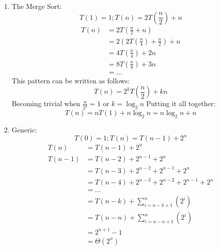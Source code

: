 \documentclass[11pt]{article}
\begin{document}
\begin{enumerate}
\begin{enumerate}
            \item The Merge Sort:
            $$T(1) = 1; T(n) = 2T(\frac{n}{2}) + n$$
            \begin{equation}
                \label{eq2}
                \begin{split}
                    T(n) & = 2T(\frac{n}{2} + n) \\
                         & = 2(2T(\frac{n}{4}) + \frac{n}{2}) + n \\
                         & = 4T(\frac{n}{4}) + 2n \\
                         & = 8T(\frac{n}{8}) + 3n \\
                         & = \ldots
                \end{split}
            \end{equation}
            This pattern can be written as follows: $$T(n) = 2^kT(\frac{n}{2}) + kn$$
            Becoming trivial when $\frac{n}{2^k} = 1$ or $k = \log_{2}n$
            Putting it all together: $$T(n) = nT(1) + n \log_{2}n = n \log_{2}n + n$$
        
            \item Generic:
            $$T(0) = 1; T(n) = T(n - 1) + 2^n$$
            \begin{equation}
                \label{eq3}
                \begin{split}
                    T(n)   & = T(n - 1) + 2^n \\
                    T(n-1) & = T(n - 2) + 2^{n-1} + 2^n \\
                           & = T(n - 3) + 2^{n-2} + 2^{n-1} + 2^n \\
                           & = T(n - 4) + 2^{n-3} + 2^{n-2} + 2^{n-1} + 2^n\\
                           & = \ldots \\
                           & = T(n - k) + \sum_{i=n-k+1}^n(2^i) \\
                           & = T(n - n) + \sum_{i=n-n+1}^n(2^i) \\
                           & = 2^{n+1} - 1 \\
                           & = \Theta(2^n)
                \end{split}
            \end{equation}
        

\end{enumerate}
\end{enumerate}
\end{document}
